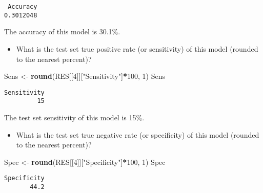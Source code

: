 \documentclass[
]{book}
\newenvironment{Shaded}{\begin{snugshade}}{\end{snugshade}}
\newcommand{\DecValTok}[1]{\textcolor[rgb]{0.00,0.00,0.81}{#1}}
\newcommand{\KeywordTok}[1]{\textcolor[rgb]{0.13,0.29,0.53}{\textbf{#1}}}
\newcommand{\NormalTok}[1]{#1}
\newcommand{\OperatorTok}[1]{\textcolor[rgb]{0.81,0.36,0.00}{\textbf{#1}}}
\newcommand{\StringTok}[1]{\textcolor[rgb]{0.31,0.60,0.02}{#1}}
\providecommand{\tightlist}{%
  \setlength{\itemsep}{0pt}\setlength{\parskip}{0pt}}
\begin{document}
\begin{Shaded}
\end{Shaded}

\begin{verbatim}
 Accuracy 
0.3012048 
\end{verbatim}

The accuracy of this model is 30.1\%.

\begin{itemize}
\tightlist
\item
  What is the test set true positive rate (or sensitivity) of this model (rounded to the nearest percent)?
\end{itemize}

\begin{Shaded}
\begin{Highlighting}[]
\NormalTok{Sens <-}\StringTok{ }\KeywordTok{round}\NormalTok{(RES[[}\DecValTok{4}\NormalTok{]][}\StringTok{"Sensitivity"}\NormalTok{]}\OperatorTok{*}\DecValTok{100}\NormalTok{, }\DecValTok{1}\NormalTok{)}
\NormalTok{Sens}
\end{Highlighting}
\end{Shaded}

\begin{verbatim}
Sensitivity 
         15 
\end{verbatim}

The test set sensitivity of this model is 15\%.

\begin{itemize}
\tightlist
\item
  What is the test set true negative rate (or specificity) of this model (rounded to the nearest percent)?
\end{itemize}

\begin{Shaded}
\begin{Highlighting}[]
\NormalTok{Spec <-}\StringTok{ }\KeywordTok{round}\NormalTok{(RES[[}\DecValTok{4}\NormalTok{]][}\StringTok{"Specificity"}\NormalTok{]}\OperatorTok{*}\DecValTok{100}\NormalTok{, }\DecValTok{1}\NormalTok{)}
\NormalTok{Spec}
\end{Highlighting}
\end{Shaded}

\begin{verbatim}
Specificity 
       44.2 
\end{verbatim}
\end{document}
